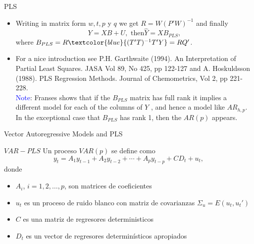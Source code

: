\documentclass{beamer}
\newcommand{\?}{?`}
\begin{document}
\begin{frame}{PLS}
  \begin{itemize}
  \item Writing in matrix form $w,t,p$ y $q$ we get $R=W(P'W)^{-1}$ and
   finally
    \begin{displaymath}
      Y=XB+U, \text{ then} \hat{Y}=XB_{PLS},
    \end{displaymath}
    where $B_{PLS}=R\textcolor{blue}{(T'T)^{-1}T'Y}=RQ'$.
  \item     \bigskip

    For a nice introduction see P.H. Garthwaite
    (1994). An Interpretation of Partial Least Squares. JASA Vol 89,
    No 425, pp 122-127 and A. Hoskuldsson (1988). PLS Regression Methods. Journal of
    Chemometrics, Vol 2, pp 221-228.\\
    \medskip
    \textcolor{blue}{Note}: Franses shows that if  the $B_{PLS}$ matrix has full rank it implies a different model for
each of the columns of $Y$ , and hence a model like $AR_{h,p}$. In the exceptional case that
$B_{PLS}$ has rank 1, then the $AR(p)$ appears.
  \end{itemize}
\end{frame}

\begin{frame}{}
  \begin{block}{}
    \begin{center}
      \vspace{3mm}
      {\Large Vector Autoregressive Models and PLS}
      \vspace{3mm}
    \end{center}
  \end{block}
\end{frame}

\begin{frame}{$VAR-PLS$}
  Un proceso $VAR(p)$ se define como
    \begin{displaymath}
      y_t=A_1y_{t-1} + A_2y_{t-2} + \cdots + A_py_{t-p} + CD_t + u_t,
    \end{displaymath}
    donde
    \begin{itemize}
    \item $A_i$, $i=1,2,\ldots, p$, son matrices de coeficientes
    \item $u_t$ es un proceso de ruido blanco con matriz de
      covarianzas $\Sigma_u=E(u_t,u_t')$
    \item $C$ es una matriz de regresores deterministicos
    \item $D_t$ es un vector de regresores determin\'isticos apropiados
    \end{itemize}
\end{frame}
\end{document}
